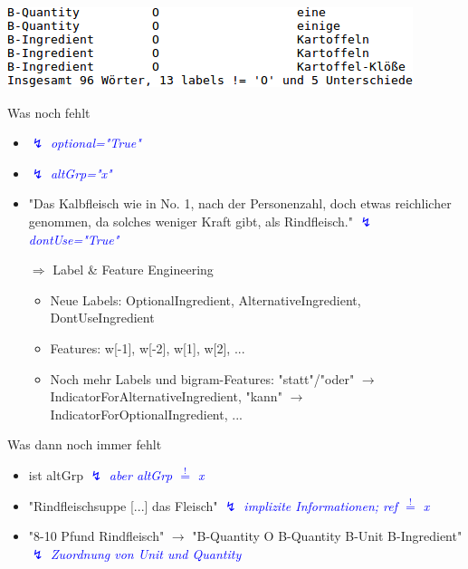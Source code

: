 \documentclass[12pt]{beamer}
\begin{document}
\begin{frame}
	\includegraphics[scale=0.9]{Images/crfPrototypUnterschiede}
\end{frame}

\begin{frame}{Was noch fehlt}
	\begin{itemize}
		\item \textcolor{blue}{$\lightning$ \textit{optional="True"}}
		
		\item \textcolor{blue}{$\lightning$ \textit{altGrp="x"}}
		
		\item "Das Kalbfleisch wie in No. 1, nach der Personenzahl, doch etwas reichlicher genommen, da solches weniger Kraft gibt, als Rindfleisch." \textcolor{blue}{$\lightning$ \large\textit{dontUse="True"}}
		
		\item[\Large$\Rightarrow$] Label \& Feature Engineering
		\begin{itemize}
			\item Neue Labels: OptionalIngredient, AlternativeIngredient, DontUseIngredient
			\item Features: w[-1], w[-2], w[1], w[2], ...
			\item Noch mehr Labels und bigram-Features: "statt"/"oder" $\rightarrow$ IndicatorForAlternativeIngredient, "kann" $\rightarrow$ IndicatorForOptionalIngredient, ... 
		\end{itemize}
	\end{itemize}
\end{frame}

\begin{frame}{Was dann noch immer fehlt}
	\begin{itemize}
		\item ist altGrp \textcolor{blue}{$\lightning$ \textit{aber altGrp $\overset{!}{=}$ x}}
		
		\item "Rindfleischsuppe [...] das Fleisch" \textcolor{blue}{$\lightning$ \textit{implizite Informationen; ref $\overset{!}{=}$ x}}
		
		\item "8-10 Pfund Rindfleisch" $\rightarrow$ "B-Quantity O B-Quantity B-Unit B-Ingredient" \textcolor{blue}{$\lightning$ \textit{Zuordnung von Unit und Quantity}}
	\end{itemize}
\end{frame}
\end{document}
